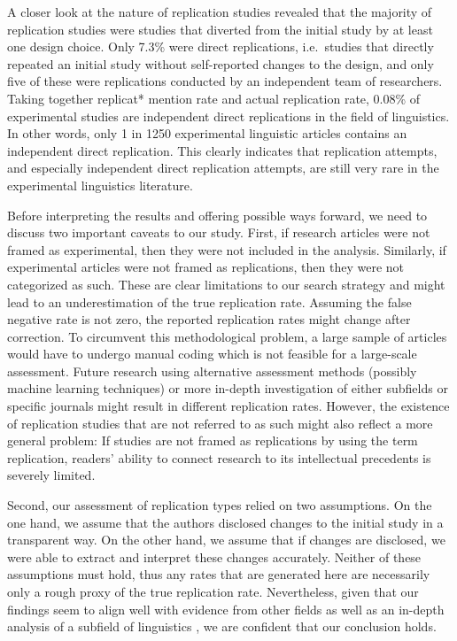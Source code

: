 \documentclass[cm,linguex]{glossa}
\begin{document}
A closer look at the nature of replication studies revealed that the majority of replication studies were studies that diverted from the initial study by at least one design choice. Only 7.3\% were direct replications, i.e.~studies that directly repeated an initial study without self-reported changes to the design, and only five of these were replications conducted by an independent team of researchers.
Taking together replicat* mention rate and actual replication rate, 0.08\% of experimental studies are independent direct replications in the field of linguistics. In other words, only 1 in 1250 experimental linguistic articles contains an independent direct replication. This clearly indicates that replication attempts, and especially independent direct replication attempts, are still very rare in the experimental linguistics literature.

Before interpreting the results and offering possible ways forward, we need to discuss two important caveats to our study. First, if research articles were not framed as experimental, then they were not included in the analysis. Similarly, if experimental articles were not framed as replications, then they were not categorized as such. These are clear limitations to our search strategy and might lead to an underestimation of the true replication rate. Assuming the false negative rate is not zero, the reported replication rates might change after correction. To circumvent this methodological problem, a large sample of articles would have to undergo manual coding which is not feasible for a large-scale assessment. Future research using alternative assessment methods (possibly machine learning techniques) or more in-depth investigation of either subfields \citep[e.g.,][]{marsden_replication_2018} or specific journals might result in different replication rates.
However, the existence of replication studies that are not referred to as such might also reflect a more general problem: If studies are not framed as replications by using the term replication, readers' ability to connect research to its intellectual precedents is severely limited.

Second, our assessment of replication types relied on two assumptions. On the one hand, we assume that the authors disclosed changes to the initial study in a transparent way. On the other hand, we assume that if changes are disclosed, we were able to extract and interpret these changes accurately. Neither of these assumptions must hold, thus any rates that are generated here are necessarily only a rough proxy of the true replication rate. Nevertheless, given that our findings seem to align well with evidence from other fields as well as an in-depth analysis of a subfield of linguistics \citep{marsden_replication_2018}, we are confident that our conclusion holds.
\end{document}
